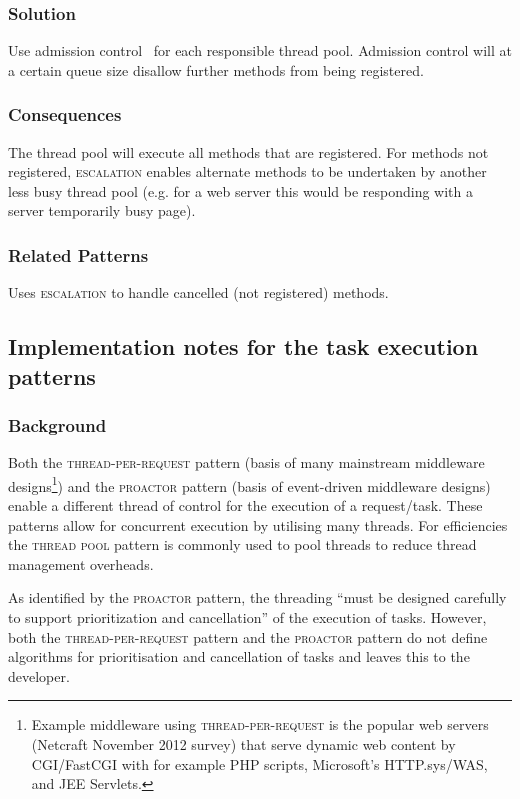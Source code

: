 \documentclass[prodmode]{style/acmlarge}
\begin{document}
\subsubsection*{Solution} Use admission control~\cite{seda} for each responsible
thread pool.  Admission control will at a certain queue size disallow further
methods from being registered.

\subsubsection*{Consequences} The thread pool will execute all methods that are
registered.  For methods not registered, \textsc{escalation} enables alternate
methods to be undertaken by another less busy thread pool (e.g. for a web server
this would be responding with a server temporarily busy page).

\subsubsection*{Related Patterns} Uses \textsc{escalation} to handle cancelled
(not registered) methods.



\subsection{Implementation notes for the task execution patterns}

\subsubsection*{Background}

Both the \textsc{thread-per-request} pattern \cite{thread-per-request} (basis of
many mainstream middleware designs\footnote{Example middleware using
\textsc{thread-per-request} is the popular web servers (Netcraft November 2012
survey) that serve dynamic web content by CGI/FastCGI with for example PHP scripts,
Microsoft's HTTP.sys/WAS, and JEE Servlets.}) and the \textsc{proactor} pattern
\cite{proactor} (basis of event-driven middleware designs) enable a different
thread of control for the execution of a request/task.  These patterns
allow for concurrent execution by utilising many threads.  For efficiencies the
\textsc{thread pool} pattern \cite{thread-per-request} is commonly used to pool
threads to reduce thread management overheads.

As identified by the \textsc{proactor} pattern, the threading ``must be designed
carefully to support prioritization and cancellation'' \cite[p. 8]{proactor} of
the execution of tasks.  However, both the \textsc{thread-per-request} pattern and
the \textsc{proactor} pattern do not define algorithms for
prioritisation and cancellation of tasks and leaves this to the developer.
\end{document}

